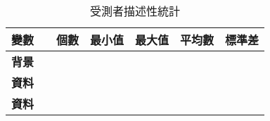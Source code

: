 \begin{table}[htbp]
\centering
\caption{受測者描述性統計}
\label{4-0}
\begin{adjustbox}{max width=0.92\textwidth}
\begin{tabular}{llrrrrr}

\toprule
\multicolumn{2}{l}{\textbf{變數}} & \textbf{個數} & \textbf{最小值} & \textbf{最大值} & \textbf{平均數} & \textbf{標準差} \\ \midrule
\multicolumn{1}{l}{\textbf{背景}} & \textbf{} & \textbf{} & \textbf{} & \textbf{} & \textbf{} & \textbf{} \\

\multicolumn{1}{l}{\textbf{資料}} & \textbf{} & \textbf{} & \textbf{} & \textbf{} & \textbf{} & \textbf{} \\

\multicolumn{1}{l}{\textbf{資料}} & \textbf{} & \textbf{} & \textbf{} & \textbf{} & \textbf{} & \textbf{} \\
\bottomrule
\end{tabular}
\end{adjustbox}
\end{table}